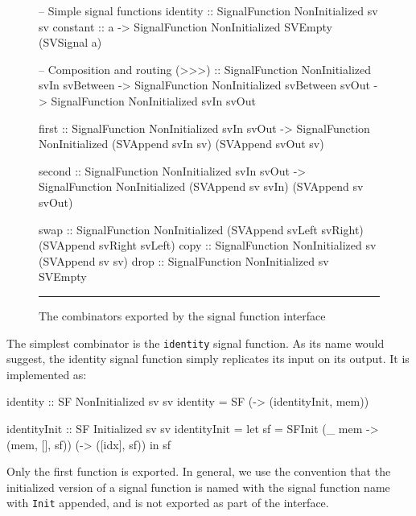 \begin{figure}
\begin{code}
-- Simple signal functions
identity :: SignalFunction NonInitialized sv sv
constant :: a -> SignalFunction NonInitialized SVEmpty (SVSignal a)

-- Composition and routing
(>>>) :: SignalFunction NonInitialized svIn svBetween
      -> SignalFunction NonInitialized svBetween svOut
      -> SignalFunction NonInitialized svIn svOut

first :: SignalFunction NonInitialized svIn svOut
      -> SignalFunction NonInitialized (SVAppend svIn sv) (SVAppend svOut sv)

second :: SignalFunction NonInitialized svIn svOut
       -> SignalFunction NonInitialized (SVAppend sv svIn) (SVAppend sv svOut)

swap :: SignalFunction NonInitialized 
          (SVAppend svLeft svRight) (SVAppend svRight svLeft)
copy :: SignalFunction NonInitialized sv (SVAppend sv sv)
drop :: SignalFunction NonInitialized sv SVEmpty
\end{code}
\hrule
\caption{The combinators exported by the signal function interface}
\label{figure:signal_function_combinators}
\end{figure}

The simplest combinator is the {\tt identity} signal function. As its name would
suggest, the identity signal function simply replicates its input on its output.
It is implemented as:

\begin{code}
identity :: SF NonInitialized sv sv
identity = SF (\mem -> (identityInit, mem))

identityInit :: SF Initialized sv sv
identityInit = let sf = SFInit (\_ mem -> (mem, [], sf))
                               (\idx -> ([idx], sf))
               in sf
\end{code}

Only the first function is exported. In general, we use the convention that
the initialized version of a signal function is named with the signal function
name with {\tt Init} appended, and is not exported as part of the interface.